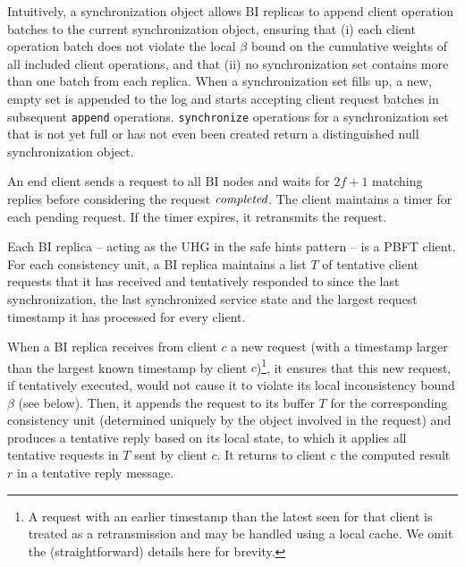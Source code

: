 \documentclass[twocolumn,10pt]{article}
\newcommand{\stitle}[1]{\vspace{2pt}{\bf #1:}}
\newcommand{\method}[1]{{\texttt{\small #1}}}
\begin{document}
Intuitively, a synchronization object allows BI replicas to append
client operation batches to the current synchronization object, ensuring
that (i) each client operation batch does not violate the local $\beta$
bound on the cumulative weights of all included client operations, and
that (ii) no synchronization set contains more than one batch from each
replica.  When a synchronization set fills up, a new, empty set is
appended to the log and starts accepting client request batches in
subsequent \method{append} operations.  \method{synchronize} operations
for a synchronization set that is not yet full or has not even been
created return a distinguished null synchronization object.
























\stitle{Clients} An end client sends a request to all BI nodes and waits
for $2f+1$ matching replies before considering the request
$\emph{completed}$.  The client maintains a timer for each pending
request. If the timer expires, it retransmits the request.


\stitle{Replicas} Each BI replica -- acting as the UHG in the safe hints
pattern -- is a PBFT client.  For each consistency unit, a BI replica
maintains a list $T$ of tentative client requests that it has received
and tentatively responded to since the last synchronization, the last
synchronized service state and the largest request timestamp it has
processed for every client.


\stitle{Client request handling} When a BI replica receives from client
$c$ a new request (with a timestamp larger than the largest known
timestamp by client $c$)\footnote{A request with an earlier timestamp
than the latest seen for that client is treated as a retransmission and
may be handled using a local cache. We omit the (straightforward)
details here for brevity.}, it ensures that this new request, if
tentatively executed, would not cause it to violate its local
inconsistency bound $\beta$ (see below).  Then, it appends the request
to its buffer $T$ for the corresponding consistency unit (determined
uniquely by the object involved in the request) and produces a tentative
reply based on its local state, to which it applies all tentative
requests in $T$ sent by client $c$.  It returns to client $c$ the
computed result $r$ in a tentative reply message.
\end{document}
